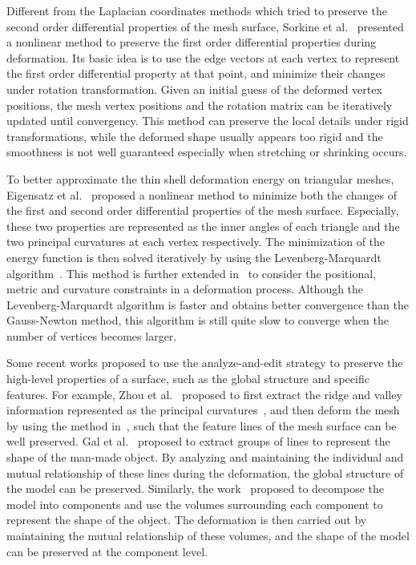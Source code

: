 Different from the Laplacian  coordinates methods which tried to
preserve the second order differential properties of the mesh
surface, Sorkine et al.~\cite{SA07} presented a nonlinear method to
preserve the first order differential properties during deformation.
Its basic idea is to use the edge vectors at each vertex to
represent the first order differential property at that point, and
minimize their changes under rotation transformation. Given an
initial guess of the deformed vertex positions, the mesh vertex
positions and the rotation matrix can be iteratively updated until
convergency. This method can preserve the local details under rigid
transformations, while the deformed shape usually appears too rigid
and the smoothness is not well guaranteed especially when stretching
or shrinking occurs.

To better approximate the thin shell  deformation energy on
triangular meshes, Eigensatz et al.~\cite{ESP08} proposed a
nonlinear method to minimize both the changes of the first and
second order differential properties of the mesh surface.
Especially, these two properties are represented as the inner angles
of each triangle and the two principal curvatures at each vertex
respectively. The minimization of the energy function is then solved
iteratively by using the Levenberg-Marquardt algorithm~\cite{MNT04}.
This method is further extended in~\cite{EP09} to consider the
positional, metric and curvature constraints in a deformation
process. Although the Levenberg-Marquardt algorithm is faster and
obtains better convergence than the Gauss-Newton method, this
algorithm is still quite slow to converge when the number of
vertices becomes larger.

Some recent works proposed to use  the analyze-and-edit strategy to
preserve the high-level properties of a surface, such as the global
structure and specific features. For example, Zhou et
al.~\cite{ZWS11} proposed to first extract the ridge and valley
information represented as the principal curvatures~\cite{HPW05},
and then deform the mesh by using the method in~\cite{ESP08}, such
that the feature lines of the mesh surface can be well preserved.
Gal et al.~\cite{GSMC09} proposed to extract groups of lines to
represent the shape of the man-made object. By analyzing and
maintaining the individual and mutual relationship of these lines
during the deformation, the global structure of the model can be
preserved. Similarly, the work~\cite{ZFCAT11} proposed to decompose
the model into components and use the volumes surrounding each
component to represent the shape of the object. The deformation is
then carried out by maintaining the mutual relationship of these
volumes, and the shape of the model can be preserved at the
component level.












